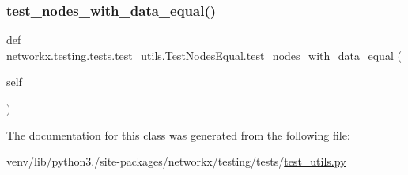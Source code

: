 \subsubsection{\texorpdfstring{test\+\_\+nodes\+\_\+with\+\_\+data\+\_\+equal()}{test\_nodes\_with\_data\_equal()}}
{\footnotesize\ttfamily def networkx.\+testing.\+tests.\+test\+\_\+utils.\+Test\+Nodes\+Equal.\+test\+\_\+nodes\+\_\+with\+\_\+data\+\_\+equal (\begin{DoxyParamCaption}\item[{}]{self }\end{DoxyParamCaption})}



The documentation for this class was generated from the following file\+:\begin{DoxyCompactItemize}
\item 
venv/lib/python3./site-\/packages/networkx/testing/tests/\hyperlink{networkx_2testing_2tests_2test__utils_8py}{test\+\_\+utils.\+py}\end{DoxyCompactItemize}
